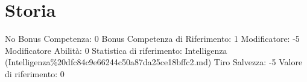 \section{Storia}\label{storia}

\begin{description}
\tightlist
\item[Tags: ABI]
No Bonus Competenza: 0 Bonus Competenza di Riferimento: 1 Modificatore:
-5 Modificatore Abilità: 0 Statistica di riferimento: Intelligenza
(Intelligenza\%20dfc84c9e66244c50a87da25ce18bffc2.md) Tiro Salvezza: -5
Valore di riferimento: 0
\end{description}
